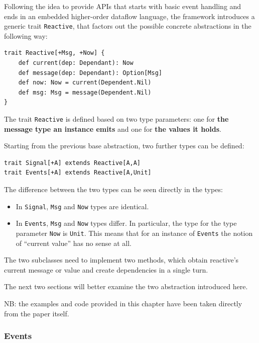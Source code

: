Following the idea to provide APIs that starts with basic event handling
and ends in an embedded higher-order dataflow language, the framework
introduces a generic trait \texttt{Reactive}, that factors out the
possible concrete abstractions in the following way:

\begin{verbatim}
trait Reactive[+Msg, +Now] {
    def current(dep: Dependant): Now
    def message(dep: Dependant): Option[Msg]
    def now: Now = current(Dependent.Nil)
    def msg: Msg = message(Dependent.Nil)
}
\end{verbatim}

The trait \texttt{Reactive} is defined based on two type parameters: one
for \textbf{the message type an instance emits} and one for \textbf{the
values it holds}.

Starting from the previous base abstraction, two further types can be
defined:

\begin{verbatim}
trait Signal[+A] extends Reactive[A,A]
trait Events[+A] extends Reactive[A,Unit]
\end{verbatim}

The difference between the two types can be seen directly in the types:

\begin{itemize}
\itemsep1pt\parskip0pt
\item
  In \texttt{Signal}, \texttt{Msg} and \texttt{Now} types are identical.
\item
  In \texttt{Events}, \texttt{Msg} and \texttt{Now} types differ. In
  particular, the type for the type parameter \texttt{Now} is
  \texttt{Unit}. This means that for an instance of \texttt{Events} the
  notion of ``current value'' has no sense at all.
\end{itemize}

The two subclasses need to implement two methods, which obtain reactive's current message or value and create dependencies in a single
turn.

The next two sections will better examine the two abstraction introduced
here.

NB: the examples and code provided in this chapter have been taken
directly from the paper itself.

\subsubsection{Events}\label{events}

